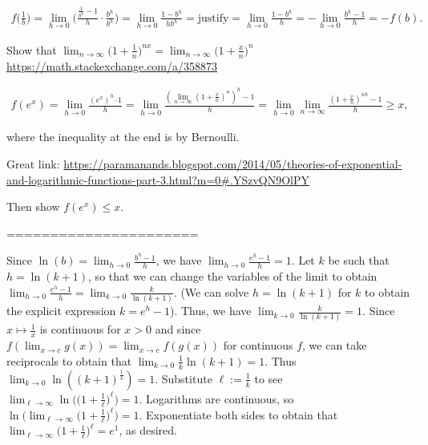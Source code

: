             \begin{align*}
                    f\Big( \frac{1}{b} \Big) = \lim_{h \rightarrow 0} \Big( \frac{\frac{1}{b^h} - 1}{h} \cdot \frac{b^h}{b^h} \Big) = \lim_{h \rightarrow 0} \frac{1 - b^h}{h b^h} = \text{justify} = \lim_{h \rightarrow 0} \frac{1 - b^h}{h} = - \lim_{h \rightarrow 0} \frac{b^h - 1}{h} = -f(b).
            \end{align*}
            
            \vspace{1cm}
            
            Show that $\lim_{n \rightarrow \infty} \Big( 1 + \frac{1}{n} \Big)^{nx} = \lim_{n \rightarrow \infty} \Big( 1 + \frac{x}{n} \Big)^n$ \url{https://math.stackexchange.com/a/358873}
            
            \begin{align*}
                f(e^x) = \lim_{h \rightarrow 0} \frac{(e^x)^h – 1}{h} = \lim_{h \rightarrow 0} \frac{(\lim_{n \rightarrow \infty} (1 + \frac{x}{n})^n)^h - 1}{h} = \lim_{h \rightarrow 0} \lim_{n \rightarrow \infty} \frac{(1 + \frac{x}{n})^{nh} - 1}{h} \geq x,
            \end{align*}
            
            where the inequality at the end is by Bernoulli.
        
            Great link: \url{https://paramanands.blogspot.com/2014/05/theories-of-exponential-and-logarithmic-functions-part-3.html?m=0#.YSzvQN9OlPY}
        
            Then show $f(e^x) \leq x$.
            
    ======================
    
    Since $\ln(b) = \lim_{h \rightarrow 0} \frac{b^h - 1}{h}$, we have $\lim_{h \rightarrow 0} \frac{e^h - 1}{h} = 1$. Let $k$ be such that $h = \ln(k + 1)$, so that we can change the variables of the limit to obtain $\lim_{h \rightarrow 0} \frac{e^h - 1}{h} = \lim_{k \rightarrow 0} \frac{k}{\ln(k + 1)}$. (We can solve $h = \ln(k + 1)$ for $k$ to obtain the explicit expression $k = e^h - 1$). Thus, we have $\lim_{k \rightarrow 0} \frac{k}{\ln(k + 1)} = 1$. Since $x \mapsto \frac{1}{x}$ is continuous for $x > 0$ and since $f(\lim_{x \rightarrow c} g(x)) = \lim_{x \rightarrow c} f(g(x))$ for continuous $f$, we can take reciprocals to obtain that $\lim_{k \rightarrow 0} \frac{1}{k} \ln(k + 1) = 1$. Thus $\lim_{k \rightarrow 0} \ln( (k + 1)^{\frac{1}{k}} ) = 1$. Substitute $\ell := \frac{1}{k}$ to see $\lim_{\ell \rightarrow \infty} \ln\Big( \Big( 1 + \frac{1}{\ell} \Big)^\ell \Big) = 1$. Logarithms are continuous, so $\ln\Big( \lim_{\ell \rightarrow \infty} \Big( 1 + \frac{1}{\ell} \Big)^\ell \Big) = 1$. Exponentiate both sides to obtain that $\lim_{\ell \rightarrow \infty} \Big( 1 + \frac{1}{\ell} \Big)^\ell = e^1$, as desired.
